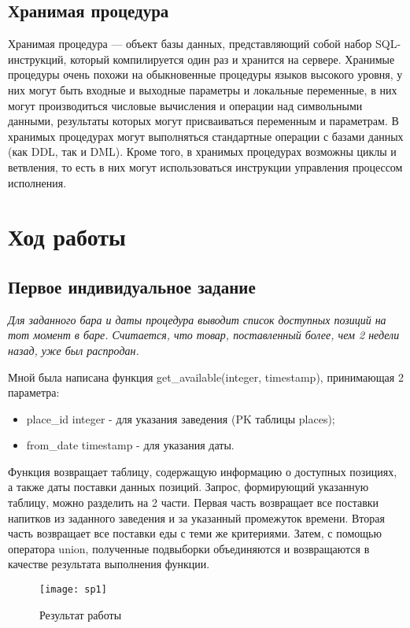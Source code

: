\subsection{Хранимая процедура}
Хранимая процедура — объект базы данных, представляющий собой набор SQL-инструкций, который компилируется один раз и хранится на сервере. Хранимые процедуры очень похожи на обыкновенные процедуры языков высокого уровня, у них могут быть входные и выходные параметры и локальные переменные, в них могут производиться числовые вычисления и операции над символьными данными, результаты которых могут присваиваться переменным и параметрам. В хранимых процедурах могут выполняться стандартные операции с базами данных (как DDL, так и DML). Кроме того, в хранимых процедурах возможны циклы и ветвления, то есть в них могут использоваться инструкции управления процессом исполнения.

\newpage
\section{Ход работы}
\subsection{Первое индивидуальное задание}
\textit{Для заданного бара и даты процедура выводит список доступных позиций на тот момент в баре. Считается, что товар, поставленный более, чем 2 недели назад, уже был распродан.}

Мной была написана функция get\_available(integer, timestamp), принимающая 2 параметра:
\begin{itemize}
	\item place\_id integer - для указания заведения (PK таблицы places);
	\item from\_date timestamp - для указания даты.
\end{itemize}

Функция возвращает таблицу, содержащую информацию о доступных позициях, а также даты поставки данных позиций.
Запрос, формирующий указанную таблицу, можно разделить на 2 части. Первая часть возвращает все поставки напитков из заданного заведения и за указанный промежуток времени. Вторая часть возвращает все поставки еды с теми же критериями.
Затем, с помощью оператора union, полученные подвыборки объединяются и возвращаются в качестве результата выполнения функции.



\begin{figure}[H]
	\begin{center}
		\texttt{[image: sp1]}
		\caption{Результат работы} 
		\label{pic:1} %
	\end{center}
\end{figure}

